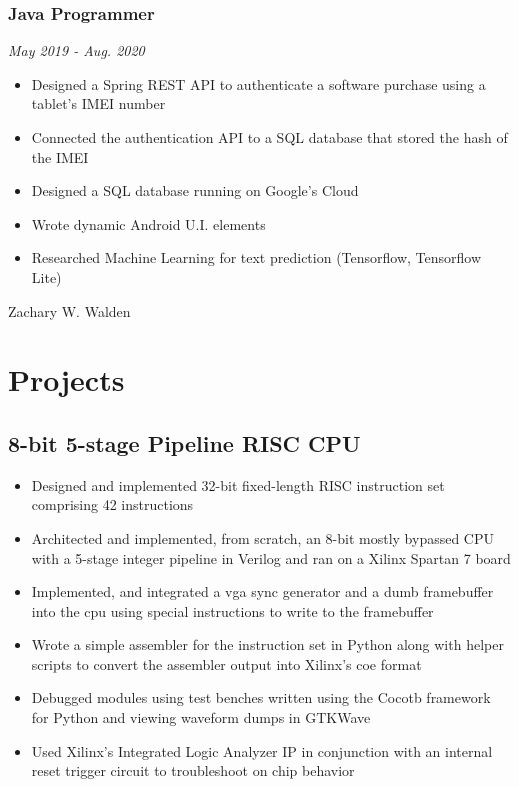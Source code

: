 \documentclass{article}
\begin{document}
\begin{spacing}{.5}
		\subsubsection{\large{Java Programmer}} \hfill \small{\textsl{May 2019 - Aug. 2020}}
			\begin{itemize}[label=--,itemsep=-.35ex]
				\item \large{Designed a Spring REST API to authenticate a software purchase using a tablet's IMEI number}
				\item \large{Connected the authentication API to a SQL database that stored the hash of the IMEI}
				\item \large{Designed a SQL database running on Google's Cloud}
				\item \large{Wrote dynamic Android U.I. elements}
				\item \large{Researched Machine Learning for text prediction} \small{(Tensorflow, Tensorflow Lite)}
			\end{itemize}

\newpage

\begin{center}
	\begin{huge}
		Zachary W. Walden\\
	\end{huge}
\end{center}

\section{Projects}
	\subsection{8-bit 5-stage Pipeline RISC CPU \hfill {}}
		\begin{itemize}[label=--,itemsep=-.35ex]
			\item \large{Designed and implemented 32-bit fixed-length RISC instruction set comprising 42 instructions}
			\item \large{Architected and implemented, from scratch, an 8-bit mostly bypassed CPU with a 5-stage integer pipeline in Verilog and ran on a Xilinx Spartan 7 board}
			\item \large{Implemented, and integrated a vga sync generator and a dumb framebuffer into the cpu using special instructions to write to the framebuffer}
			\item \large{Wrote a simple assembler for the instruction set in Python along with helper scripts to convert the assembler output into Xilinx's coe format}
			\item \large{Debugged modules using test benches written using the Cocotb framework for Python and viewing waveform dumps in GTKWave}
			\item \large{Used Xilinx's Integrated Logic Analyzer IP in conjunction with an internal reset trigger circuit to troubleshoot on chip behavior}
		\end{itemize}

\end{spacing}
\end{document}
